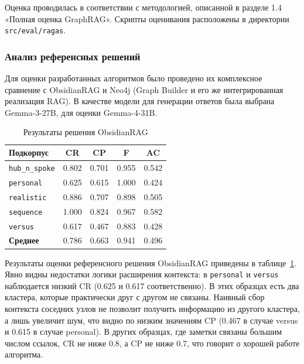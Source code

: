Оценка проводилась в соответствии с методологией,
описанной в разделе 1.4 «Полная оценка GraphRAG».
Скрипты оценивания расположены в директории \texttt{src/eval/ragas}.

\subsubsection{Анализ референсных решений}
\label{sec:reference_results}

Для оценки разработанных алгоритмов было проведено
их комплексное сравнение с ObsidianRAG и Neo4j
(Graph Builder и его же интегрированная реализация RAG).
В качестве модели для генерации ответов была выбрана Gemma-3-27B,
для оценки Gemma-4-31B.

\begin{table}[H]
    \caption{Результаты решения ObsidianRAG}
    \label{tab:reference_results_obsidianrag}
    \centering
    \begin{tabular}{lcccc}
        \hline
        \textbf{Подкорпус}     & \textbf{CR} & \textbf{CP} & \textbf{F} & \textbf{AC} \\
        \hline
        \texttt{hub\_n\_spoke} & 0.802       & 0.701       & 0.955      & 0.542       \\
        \texttt{personal}      & 0.625       & 0.615       & 1.000      & 0.424       \\
        \texttt{realistic}     & 0.886       & 0.707       & 0.898      & 0.505       \\
        \texttt{sequence}      & 1.000       & 0.824       & 0.967      & 0.582       \\
        \texttt{versus}        & 0.617       & 0.467       & 0.883      & 0.428       \\
        \hline
        \textbf{Среднее}       & 0.786       & 0.663       & 0.941      & 0.496       \\
        \hline
    \end{tabular}
\end{table}

Результаты оценки референсного решения ObsidianRAG приведены в таблице~\ref{tab:reference_results_obsidianrag}.
Явно видны недостатки логики расширения контекста: в
\texttt{personal} и \texttt{versus} наблюдается низкий CR (0.625 и 0.617 соответственно).
В этих образцах есть два кластера, которые практически друг с другом не связаны.
Наивный сбор контекста соседних узлов не позволит получить информацию из другого кластера,
а лишь увеличит шум, что видно по низким значениям CP
(0.467 в случае versus и 0.615 в случае personal).
В других образцах, где заметки связаны большим числом ссылок, CR не ниже 0.8, а CP не ниже 0.7,
что говорит о хорошей работе алгоритма.


